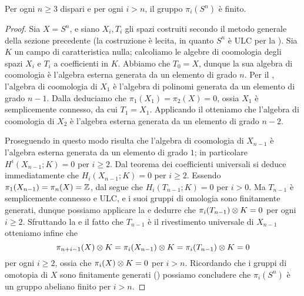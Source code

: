 \begin{proposition}
Per ogni $n\ge 3$ dispari e per ogni $i>n$, il gruppo $\pi_i(S^n)$ è finito.
\end{proposition}
\begin{proof}
Sia $X=S^n$, e siano $X_i,T_i$ gli spazi costruiti secondo il metodo generale della sezione precedente (la costruzione è lecita, in quanto $S^n$ è ULC per la ). Sia $K$ un campo di caratteristica nulla; calcoliamo le algebre di coomologia degli spazi $X_i$ e $T_i$ a coefficienti in $K$. Abbiamo che $T_0=X$, dunque la sua algebra di coomologia è l'algebra esterna generata da un elemento di grado $n$. Per il , l'algebra di coomologia di $X_1$ è l'algebra di polinomi generata da un elemento di grado $n-1$. Dalla  deduciamo che $\pi_1(X_1)=\pi_2(X)=0$, ossia $X_1$ è semplicemente connesso, da cui $T_1=X_1$. Applicando il  otteniamo che l'algebra di coomologia di $X_2$ è l'algebra esterna generata da un elemento di grado $n-2$.

Proseguendo in questo modo risulta che l'algebra di coomologia di $X_{n-1}$ è l'algebra esterna generata da un elemento di grado $1$; in particolare $H^i(X_{n-1};K)=0$ per $i\ge 2$. Dal teorema dei coefficienti universali si deduce immediatamente che $H_i(X_{n-1};K)=0$ per $i\ge 2$. Essendo $\pi_1(X_{n-1})=\pi_n(X)=\mathbb{Z}$, dal  segue che $H_i(T_{n-1};K)=0$ per $i>0$. Ma $T_{n-1}$ è semplicemente connesso e ULC, e i suoi gruppi di omologia sono finitamente generati, dunque possiamo applicare la  e dedurre che $\pi_i(T_{n-1})\mathbin{\otimes} K=0$ per ogni $i\ge 2$. Sfruttando la  e il fatto che $T_{n-1}$ è il rivestimento universale di $X_{n-1}$ otteniamo infine che 
$$
\pi_{n+i-1}(X)\mathbin{\otimes} K=\pi_i(X_{n-1})\mathbin{\otimes} K=\pi_i(T_{n-1})\mathbin{\otimes} K=0
$$
per ogni $i\ge 2$, ossia che $\pi_i(X)\mathbin{\otimes} K=0$ per $i>n$. Ricordando che i gruppi di omotopia di $X$ sono finitamente generati () possiamo concludere che $\pi_i(S^n)$ è un gruppo abeliano finito per $i>n$.
\end{proof}